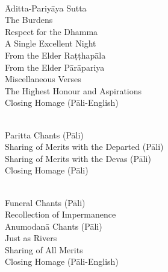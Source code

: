 \begin{center}
  \bigskip

  {\libertinusFont\selectfont\textbf{\textsc{}}}\\

  Āditta-Pariyāya Sutta\\
  The Burdens\\
  Respect for the Dhamma\\
  A Single Excellent Night\\
  From the Elder Raṭṭhapāla\\
  From the Elder Pārāpariya\\
  Miscellaneous Verses\\
  The Highest Honour and Aspirations\\
  Closing Homage (Pāli-English)\\ %

  \bigskip
  \clearpage

  {\libertinusFont\selectfont\textbf{\textsc{}}}\\

  Paritta Chants (Pāli)\\
  Sharing of Merits with the Departed (Pāli)\\
  Sharing of Merits with the Devas (Pāli)\\
  Closing Homage (Pāli)\\

  \bigskip

  {\libertinusFont\selectfont\textbf{\textsc{}}}\\

  Funeral Chants (Pāli)\\
  Recollection of Impermanence\\
  Anumodanā Chants (Pāli)\\
  Just as Rivers\\
  Sharing of All Merits\\
  Closing Homage (Pāli-English)\\

\end{center}
